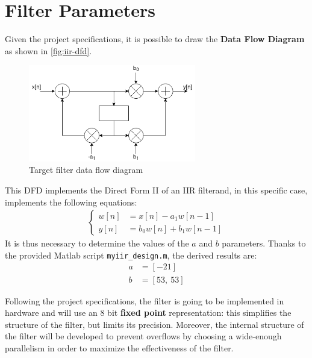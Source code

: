 \section{Filter Parameters}
Given the project specifications, it is possible to draw the \textbf{Data Flow Diagram} as shown in \autoref{fig:iir-dfd}.
\begin{figure}[htbp]
	\centering
	\includegraphics[width=0.65\textwidth]{chapter1/images/iir-dfd.png}
	\caption{Target filter data flow diagram}
	\label{fig:iir-dfd}
\end{figure}

This DFD implements the Direct Form II of an IIR filterand, in this specific case, implements the following equations:
\begin{align}
	\begin{cases}
		w[n] &= x[n] - a_1 w[n-1] 		\\
		y[n] &= b_0 w[n] + b_1 w[n-1]
	\end{cases}
	\label{eqn:iir}
\end{align}
It is thus necessary to determine the values of the $a$ and $b$ parameters. Thanks to the provided Matlab script \texttt{myiir\_design.m}, the derived results are:
\begin{align}
    a &= [-21] \\
    b &= [53,\ 53]
\end{align}

Following the project specifications, the filter is going to be implemented in hardware and will use an 8 bit \textbf{fixed point} representation: this simplifies the structure of the filter, but limits its precision. Moreover, the internal structure of the filter will be developed to prevent overflows by choosing a wide-enough parallelism in order to maximize the effectiveness of the filter.
